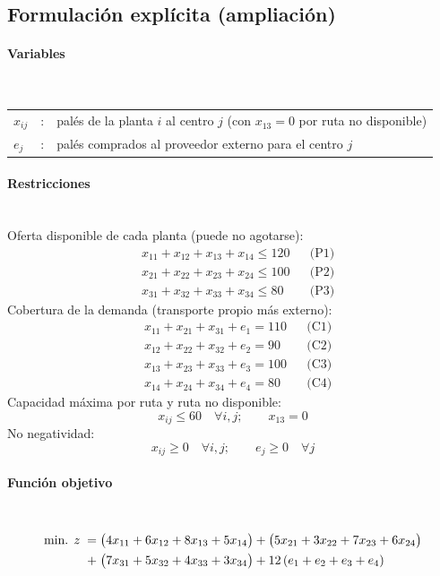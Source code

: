 \subsection{Formulación explícita (ampliación)}

\paragraph{Variables}\mbox{}\\
\begin{tabular}{l c l}
    $x_{ij}$ & : & palés de la planta $i$ al centro $j$ (con $x_{13}=0$ por ruta no disponible)\\
    $e_j$    & : & palés comprados al proveedor externo para el centro $j$ \\
\end{tabular}

\paragraph{Restricciones}\mbox{}\\
Oferta disponible de cada planta (puede no agotarse):
\begin{align}
    & x_{11} + x_{12} + x_{13} + x_{14} \leq 120 && \text{(P1)}\\
    & x_{21} + x_{22} + x_{23} + x_{24} \leq 100 && \text{(P2)}\\
    & x_{31} + x_{32} + x_{33} + x_{34} \leq 80 && \text{(P3)}
\end{align}
Cobertura de la demanda (transporte propio más externo):
\begin{align}
    & x_{11} + x_{21} + x_{31} + e_1 = 110 && \text{(C1)}\\
    & x_{12} + x_{22} + x_{32} + e_2 = 90 && \text{(C2)}\\
    & x_{13} + x_{23} + x_{33} + e_3 = 100 && \text{(C3)}\\
    & x_{14} + x_{24} + x_{34} + e_4 = 80 && \text{(C4)}
\end{align}
Capacidad máxima por ruta y ruta no disponible:
\begin{equation}
    x_{ij} \leq 60 \quad \forall i,j; \qquad x_{13} = 0
\end{equation}
No negatividad:
\begin{equation}
    x_{ij} \geq 0 \quad \forall i,j; \qquad e_j \geq 0 \quad \forall j
\end{equation}

\paragraph{Función objetivo}\mbox{}\\
\begin{align}
\mbox{min. } z \;=\;
& \big(4x_{11} + 6x_{12} + 8x_{13} + 5x_{14}\big) + \big(5x_{21} + 3x_{22} + 7x_{23} + 6x_{24}\big) \notag\\
+\;& \big(7x_{31} + 5x_{32} + 4x_{33} + 3x_{34}\big) + 12\,(e_1 + e_2 + e_3 + e_4)
\end{align}

